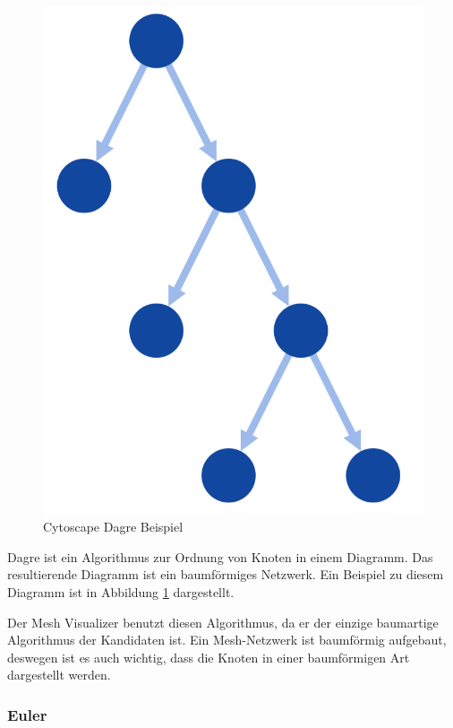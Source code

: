 \begin{figure}[H] 
    \begin{center}
        \includegraphics[scale=0.5]{images/cytoscape-dagre-example.png}
        \caption{Cytoscape Dagre Beispiel \cite{cytoscape_dagre}}
        \label{abb:cytoscape-dagre_example}
    \end{center}    
\end{figure}

Dagre ist ein Algorithmus zur Ordnung von Knoten in einem Diagramm. Das resultierende Diagramm ist ein baumförmiges Netzwerk.
Ein Beispiel zu diesem Diagramm ist in Abbildung \ref{abb:cytoscape-dagre_example} dargestellt.

Der Mesh Visualizer benutzt diesen Algorithmus, da er der einzige baumartige Algorithmus der Kandidaten ist. Ein Mesh-Netzwerk ist baumförmig aufgebaut, deswegen ist es auch wichtig, dass die Knoten in einer baumförmigen Art dargestellt werden.

\subsubsection{Euler}\label{sec:cytoscape-euler}


